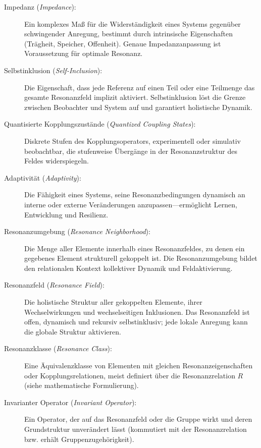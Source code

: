 \documentclass[12pt]{article}
\begin{document}
\begin{description}
	\item[Impedanz (\textit{Impedance}):]  
	Ein komplexes Maß für die Widerständigkeit eines Systems gegenüber schwingender Anregung, bestimmt durch intrinsische Eigenschaften (Trägheit, Speicher, Offenheit). Genaue Impedanzanpassung ist Voraussetzung für optimale Resonanz.
	
	\item[Selbstinklusion (\textit{Self-Inclusion}):]  
	Die Eigenschaft, dass jede Referenz auf einen Teil oder eine Teilmenge das gesamte Resonanzfeld implizit aktiviert. Selbstinklusion löst die Grenze zwischen Beobachter und System auf und garantiert holistische Dynamik.
	
	\item[Quantisierte Kopplungszustände (\textit{Quantized Coupling States}):]  
	Diskrete Stufen des Kopplungsoperators, experimentell oder simulativ beobachtbar, die stufenweise Übergänge in der Resonanzstruktur des Feldes widerspiegeln.
	
	\item[Adaptivität (\textit{Adaptivity}):]  
	Die Fähigkeit eines Systems, seine Resonanzbedingungen dynamisch an interne oder externe Veränderungen anzupassen—ermöglicht Lernen, Entwicklung und Resilienz.
	
	\item[Resonanzumgebung (\textit{Resonance Neighborhood}):]  
	Die Menge aller Elemente innerhalb eines Resonanzfeldes, zu denen ein gegebenes Element strukturell gekoppelt ist. Die Resonanzumgebung bildet den relationalen Kontext kollektiver Dynamik und Feldaktivierung.
	
	\item[Resonanzfeld (\textit{Resonance Field}):]  
	Die holistische Struktur aller gekoppelten Elemente, ihrer Wechselwirkungen und wechselseitigen Inklusionen. Das Resonanzfeld ist offen, dynamisch und rekursiv selbstinklusiv; jede lokale Anregung kann die globale Struktur aktivieren.
	
	\item[Resonanzklasse (\textit{Resonance Class}):]  
	Eine Äquivalenzklasse von Elementen mit gleichen Resonanzeigenschaften oder Kopplungsrelationen, meist definiert über die Resonanzrelation $R$ (siehe mathematische Formulierung).
	
	\item[Invarianter Operator (\textit{Invariant Operator}):]  
	Ein Operator, der auf das Resonanzfeld oder die Gruppe wirkt und deren Grundstruktur unverändert lässt (kommutiert mit der Resonanzrelation bzw. erhält Gruppenzugehörigkeit).
	

\end{description}
\end{document}

